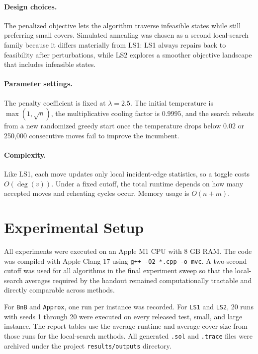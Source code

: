 \documentclass[sigconf,nonacm]{acmart}
\begin{document}
\paragraph{Design choices.}
The penalized objective lets the algorithm traverse infeasible states while still preferring small covers. Simulated annealing was chosen as a second local-search family because it differs materially from LS1: LS1 always repairs back to feasibility after perturbations, while LS2 explores a smoother objective landscape that includes infeasible states.

\paragraph{Parameter settings.}
The penalty coefficient is fixed at $\lambda = 2.5$. The initial temperature is $\max(1,\sqrt{n})$, the multiplicative cooling factor is $0.9995$, and the search reheats from a new randomized greedy start once the temperature drops below $0.02$ or 250{,}000 consecutive moves fail to improve the incumbent.

\paragraph{Complexity.}
Like LS1, each move updates only local incident-edge statistics, so a toggle costs $O(\deg(v))$. Under a fixed cutoff, the total runtime depends on how many accepted moves and reheating cycles occur. Memory usage is $O(n+m)$.

\section{Experimental Setup}
All experiments were executed on an Apple M1 CPU with 8 GB RAM. The code was compiled with Apple Clang 17 using \texttt{g++ -O2 *.cpp -o mvc}. A two-second cutoff was used for all algorithms in the final experiment sweep so that the local-search averages required by the handout remained computationally tractable and directly comparable across methods.

For \texttt{BnB} and \texttt{Approx}, one run per instance was recorded. For \texttt{LS1} and \texttt{LS2}, 20 runs with seeds 1 through 20 were executed on every released test, small, and large instance. The report tables use the average runtime and average cover size from those runs for the local-search methods. All generated \texttt{.sol} and \texttt{.trace} files were archived under the project \texttt{results/outputs} directory.
\end{document}
